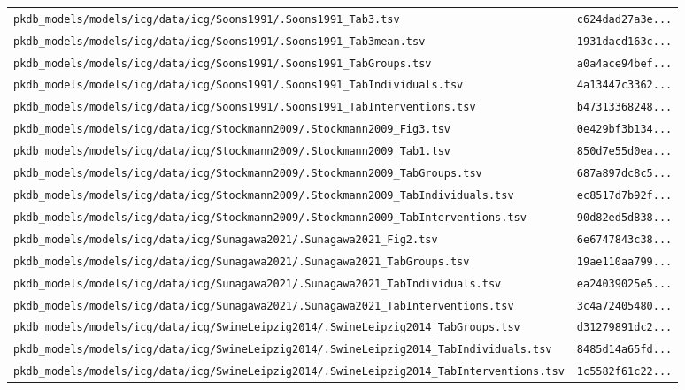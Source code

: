 \begin{longtable}{ll}
\texttt{pkdb\_models/models/icg/data/icg/Soons1991/.Soons1991\_Tab3.tsv} & \texttt{c624dad27a3e...} \\
\texttt{pkdb\_models/models/icg/data/icg/Soons1991/.Soons1991\_Tab3mean.tsv} & \texttt{1931dacd163c...} \\
\texttt{pkdb\_models/models/icg/data/icg/Soons1991/.Soons1991\_TabGroups.tsv} & \texttt{a0a4ace94bef...} \\
\texttt{pkdb\_models/models/icg/data/icg/Soons1991/.Soons1991\_TabIndividuals.tsv} & \texttt{4a13447c3362...} \\
\texttt{pkdb\_models/models/icg/data/icg/Soons1991/.Soons1991\_TabInterventions.tsv} & \texttt{b47313368248...} \\
\texttt{pkdb\_models/models/icg/data/icg/Stockmann2009/.Stockmann2009\_Fig3.tsv} & \texttt{0e429bf3b134...} \\
\texttt{pkdb\_models/models/icg/data/icg/Stockmann2009/.Stockmann2009\_Tab1.tsv} & \texttt{850d7e55d0ea...} \\
\texttt{pkdb\_models/models/icg/data/icg/Stockmann2009/.Stockmann2009\_TabGroups.tsv} & \texttt{687a897dc8c5...} \\
\texttt{pkdb\_models/models/icg/data/icg/Stockmann2009/.Stockmann2009\_TabIndividuals.tsv} & \texttt{ec8517d7b92f...} \\
\texttt{pkdb\_models/models/icg/data/icg/Stockmann2009/.Stockmann2009\_TabInterventions.tsv} & \texttt{90d82ed5d838...} \\
\texttt{pkdb\_models/models/icg/data/icg/Sunagawa2021/.Sunagawa2021\_Fig2.tsv} & \texttt{6e6747843c38...} \\
\texttt{pkdb\_models/models/icg/data/icg/Sunagawa2021/.Sunagawa2021\_TabGroups.tsv} & \texttt{19ae110aa799...} \\
\texttt{pkdb\_models/models/icg/data/icg/Sunagawa2021/.Sunagawa2021\_TabIndividuals.tsv} & \texttt{ea24039025e5...} \\
\texttt{pkdb\_models/models/icg/data/icg/Sunagawa2021/.Sunagawa2021\_TabInterventions.tsv} & \texttt{3c4a72405480...} \\
\texttt{pkdb\_models/models/icg/data/icg/SwineLeipzig2014/.SwineLeipzig2014\_TabGroups.tsv} & \texttt{d31279891dc2...} \\
\texttt{pkdb\_models/models/icg/data/icg/SwineLeipzig2014/.SwineLeipzig2014\_TabIndividuals.tsv} & \texttt{8485d14a65fd...} \\
\texttt{pkdb\_models/models/icg/data/icg/SwineLeipzig2014/.SwineLeipzig2014\_TabInterventions.tsv} & \texttt{1c5582f61c22...} \\

\end{longtable}
